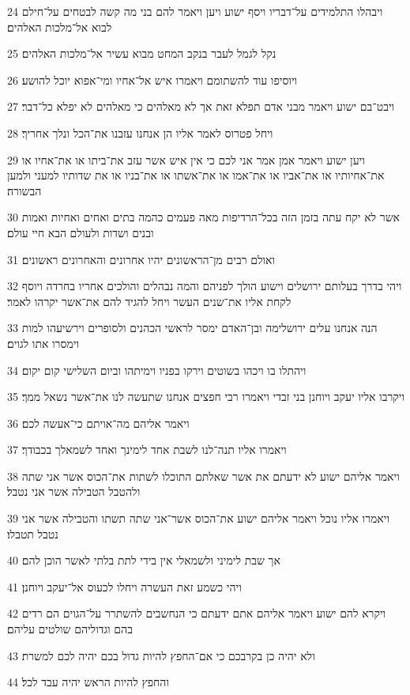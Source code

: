 \par 24 ויבהלו התלמידים על־דבריו ויסף ישוע ויען ויאמר להם בני מה קשה לבטחים על־חילם לבוא אל־מלכות האלהים׃
\par 25 נקל לגמל לעבר בנקב המחט מבוא עשיר אל־מלכות האלהים׃
\par 26 ויוסיפו עוד להשתומם ויאמרו איש אל־אחיו ומי־אפוא יוכל להושע׃
\par 27 ויבט־בם ישוע ויאמר מבני אדם תפלא זאת אך לא מאלהים כי מאלהים לא יפלא כל־דבר׃
\par 28 ויחל פטרוס לאמר אליו הן אנחנו עזבנו את־הכל ונלך אחריך׃
\par 29 ויען ישוע ויאמר אמן אמר אני לכם כי אין איש אשר עזב את־ביתו או את־אחיו או את־אחיותיו או את־אביו או את־אמו או את־אשתו או את־בניו או את שדותיו למעני ולמען הבשורה׃
\par 30 אשר לא יקח עתה בזמן הזה בכל־הרדיפות מאה פעמים כהמה בתים ואחים ואחיות ואמות ובנים ושדות ולעולם הבא חיי עולם׃
\par 31 ואולם רבים מן־הראשונים יהיו אחרונים והאחרונים ראשונים׃
\par 32 ויהי בדרך בעלותם ירושלים וישוע הולך לפניהם והמה נבהלים והולכים אחריו בחרדה ויוסף לקחת אליו את־שנים העשר ויחל להגיד להם את־אשר יקרהו לאמר׃
\par 33 הנה אנחנו עלים ירושלימה ובן־האדם ימסר לראשי הכהנים ולסופרים וירשיעהו למות וימסרו אתו לגוים׃
\par 34 ויהתלו בו ויכהו בשוטים וירקו בפניו וימיתהו וביום השלישי קום יקום׃
\par 35 ויקרבו אליו יעקב ויוחנן בני זבדי ויאמרו רבי חפצים אנחנו שתעשה לנו את־אשר נשאל ממך׃
\par 36 ויאמר אליהם מה־אויתם כי־אעשה לכם׃
\par 37 ויאמרו אליו תנה־לנו לשבת אחד לימינך ואחד לשמאלך בכבודך׃
\par 38 ויאמר אליהם ישוע לא ידעתם את אשר שאלתם התוכלו לשתות את־הכוס אשר אני שתה ולהטבל הטבילה אשר אני נטבל׃
\par 39 ויאמרו אליו נוכל ויאמר אליהם ישוע את־הכוס אשר־אני שתה תשתו והטבילה אשר אני נטבל תטבלו׃
\par 40 אך שבת לימיני ולשמאלי אין בידי לתת בלתי לאשר הוכן להם׃
\par 41 ויהי כשמע זאת העשרה ויחלו לכעוס אל־יעקב ויוחנן׃
\par 42 ויקרא להם ישוע ויאמר אליהם אתם ידעתם כי הנחשבים להשתרר על־הגוים הם רדים בהם וגדוליהם שולטים עליהם׃
\par 43 ולא יהיה כן בקרבכם כי אם־החפץ להיות גדול בכם יהיה לכם למשרת׃
\par 44 והחפץ להיות הראש יהיה עבד לכל׃
